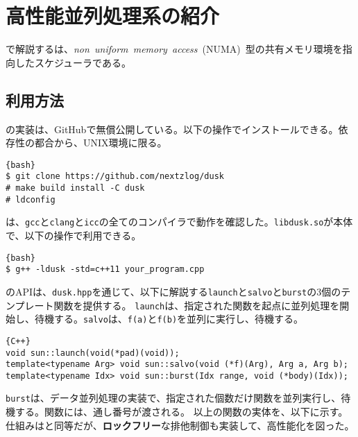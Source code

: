 \documentclass[10pt,a4paper]{book}
\begin{document}
\chapter{高性能並列処理系の紹介\label{chap:dusk}}

で解説する\dusk{}は、\textit{non~uniform~memory~access}~(NUMA)~型の共有メモリ環境を指向したスケジューラである。

\section{利用方法\label{sect:dusk.api}}

\dusk{}の実装は、GitHubで無償公開している。以下の操作でインストールできる。依存性の都合から、UNIX環境に限る。

\begin{Verbatim}{bash}
$ git clone https://github.com/nextzlog/dusk
# make build install -C dusk
# ldconfig
\end{Verbatim}

\dusk{}は、\texttt{gcc}と\texttt{clang}と\texttt{icc}の全てのコンパイラで動作を確認した。\texttt{libdusk.so}が本体で、以下の操作で利用できる。

\begin{Verbatim}{bash}
$ g++ -ldusk -std=c++11 your_program.cpp
\end{Verbatim}

\dusk{}のAPIは、\texttt{dusk.hpp}を通じて、以下に解説する\texttt{launch}と\texttt{salvo}と\texttt{burst}の3個のテンプレート関数を提供する。
\texttt{launch}は、指定された関数を起点に並列処理を開始し、待機する。\texttt{salvo}は、\texttt{f(a)}と\texttt{f(b)}を並列に実行し、待機する。

\begin{Verbatim}{C++}
void sun::launch(void(*pad)(void));
template<typename Arg> void sun::salvo(void (*f)(Arg), Arg a, Arg b);
template<typename Idx> void sun::burst(Idx range, void (*body)(Idx));
\end{Verbatim}

\texttt{burst}は、データ並列処理の実装で、指定された個数だけ関数を並列実行し、待機する。関数には、通し番号が渡される。
以上の関数の実体を、以下に示す。仕組みはと同等だが、\textbf{ロックフリー}な排他制御も実装して、高性能化を図った。
\end{document}
